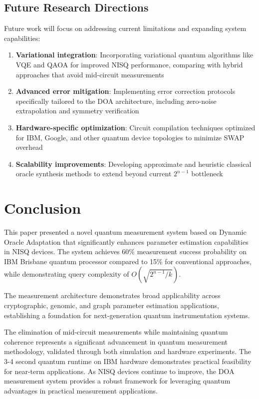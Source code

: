 \documentclass[journal]{IEEEtran}
\begin{document}
\subsection{Future Research Directions}

Future work will focus on addressing current limitations and expanding system capabilities:

\begin{enumerate}
\item \textbf{Variational integration}: Incorporating variational quantum algorithms like VQE and QAOA for improved NISQ performance, comparing with hybrid approaches that avoid mid-circuit measurements \cite{10590348, 10848114}
\item \textbf{Advanced error mitigation}: Implementing error correction protocols specifically tailored to the DOA architecture, including zero-noise extrapolation and symmetry verification \cite{9142431}
\item \textbf{Hardware-specific optimization}: Circuit compilation techniques optimized for IBM, Google, and other quantum device topologies to minimize SWAP overhead \cite{sünkel2025quantumcircuitconstructionoptimization}
\item \textbf{Scalability improvements}: Developing approximate and heuristic classical oracle synthesis methods to extend beyond current $2^{n-1}$ bottleneck
\end{enumerate}

\section{Conclusion}

This paper presented a novel quantum measurement system based on Dynamic Oracle Adaptation that significantly enhances parameter estimation capabilities in NISQ devices. The system achieves 60\% measurement success probability on IBM Brisbane quantum processor compared to 15\% for conventional approaches, while demonstrating query complexity of $O(\sqrt{2^{n-1}/k})$.

The measurement architecture demonstrates broad applicability across cryptographic, genomic, and graph parameter estimation applications, establishing a foundation for next-generation quantum instrumentation systems.

The elimination of mid-circuit measurements while maintaining quantum coherence represents a significant advancement in quantum measurement methodology, validated through both simulation and hardware experiments. The 3-4 second quantum runtime on IBM hardware demonstrates practical feasibility for near-term applications. As NISQ devices continue to improve, the DOA measurement system provides a robust framework for leveraging quantum advantages in practical measurement applications.
\end{document}
